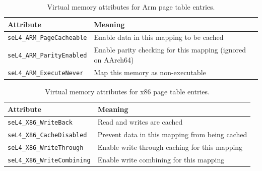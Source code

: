 \begin{table}[htb]
  \begin{center}
    \begin{tabularx}{\textwidth}{p{}X}
      \toprule
      Attribute & Meaning \\
      \midrule
      \texttt{seL4\_ARM\_PageCacheable} & Enable data in this mapping
      to be cached \\
      \texttt{seL4\_ARM\_ParityEnabled} & Enable parity checking for
      this mapping (ignored on AArch64) \\
      \texttt{seL4\_ARM\_ExecuteNever} & Map this memory as non-executable \\
      \bottomrule
    \end{tabularx}
    \caption{\label{tbl:vmattr_arm} Virtual memory attributes for Arm page
      table entries.}
  \end{center}
\end{table}

\begin{table}[htb]
  \begin{center}
    \begin{tabularx}{\textwidth}{p{}X}
      \toprule
      Attribute & Meaning \\
      \midrule
      \texttt{seL4\_X86\_WriteBack} & Read and writes are cached \\
      \texttt{seL4\_X86\_CacheDisabled} & Prevent data in this mapping
      from being cached \\
      \texttt{seL4\_X86\_WriteThrough} & Enable write through caching for this mapping \\
      \texttt{seL4\_X86\_WriteCombining} & Enable write combining for this mapping \\
      \bottomrule
    \end{tabularx}
    \caption{\label{tbl:vmattr_x86} Virtual memory attributes for x86 page
      table entries.}
  \end{center}
\end{table}

